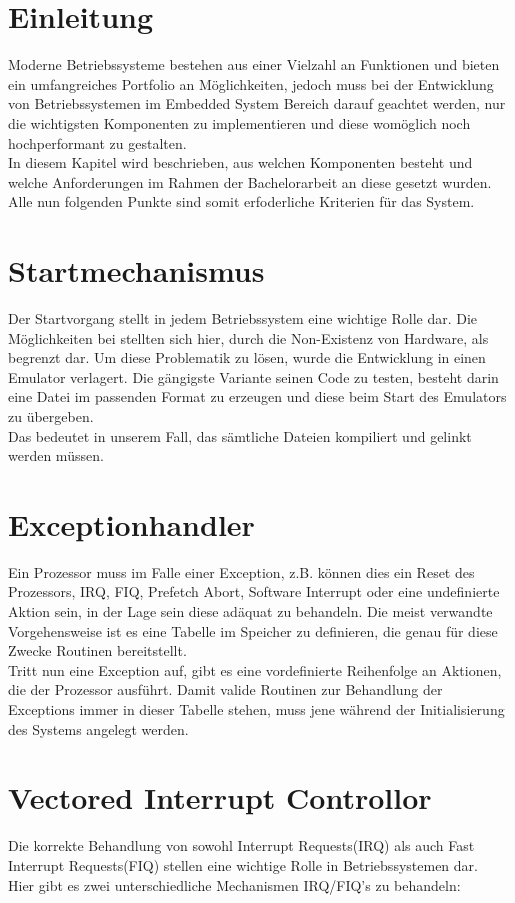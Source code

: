 \section{Einleitung}
Moderne Betriebssysteme bestehen aus einer Vielzahl an Funktionen und bieten ein umfangreiches Portfolio an M\"oglichkeiten, jedoch muss bei der Entwicklung von Betriebssystemen im Embedded System Bereich darauf geachtet werden, nur die wichtigsten Komponenten zu implementieren und diese wom\"oglich noch hochperformant zu gestalten.\\
In diesem Kapitel wird beschrieben, aus welchen Komponenten \mops besteht und welche Anforderungen im Rahmen der Bachelorarbeit an diese gesetzt wurden. Alle nun folgenden Punkte sind somit erfoderliche Kriterien f\"ur das System.
\section{Startmechanismus}
Der Startvorgang stellt in jedem Betriebssystem eine wichtige Rolle dar. Die M\"oglichkeiten bei \mops stellten sich hier, durch die Non-Existenz von Hardware, als begrenzt dar. Um diese Problematik zu l\"osen, wurde die Entwicklung in einen Emulator verlagert.
Die g\"angigste Variante seinen Code zu testen, besteht darin eine Datei im passenden Format zu erzeugen und diese beim Start des Emulators zu \"ubergeben. \\
Das bedeutet in unserem Fall, das s\"amtliche Dateien kompiliert und gelinkt werden m\"ussen.
\section{Exceptionhandler}
Ein Prozessor muss im Falle einer Exception, z.B. k\"onnen dies ein Reset des Prozessors, IRQ, FIQ, Prefetch Abort, Software Interrupt oder eine undefinierte Aktion sein, in der Lage sein diese ad\"aquat zu behandeln. Die meist verwandte Vorgehensweise ist es eine Tabelle im Speicher zu definieren, die genau f\"ur diese Zwecke Routinen bereitstellt\parencite[53]{archManI}.\\ Tritt nun eine Exception auf, gibt es eine vordefinierte Reihenfolge an Aktionen, die der Prozessor ausf\"uhrt. Damit valide Routinen zur Behandlung der Exceptions immer in dieser Tabelle stehen, muss jene w\"ahrend der Initialisierung des Systems angelegt werden.
\section{Vectored Interrupt Controllor}
Die korrekte Behandlung von sowohl Interrupt Requests(IRQ) als auch Fast Interrupt Requests(FIQ) stellen eine wichtige Rolle in Betriebssystemen dar.\\
Hier gibt es zwei unterschiedliche Mechanismen IRQ/FIQ's zu behandeln:

